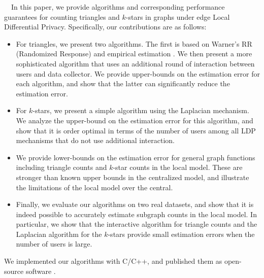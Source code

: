 \smallskip
{}~~In this paper, we provide 
algorithms and corresponding performance guarantees for counting triangles and $k$-stars in graphs under edge Local Differential Privacy. Specifically, our contributions are as follows:
\begin{itemize}
    \item For triangles, we present two algorithms. The first is based on 
    Warner's RR (Randomized Response) \cite{Warner_JASA65} 
    and empirical estimation \cite{Kairouz_ICML16,Murakami_USENIX19,Wang_USENIX17}. 
    We then present a more sophisticated algorithm that uses an additional round of interaction between users and data collector. We provide upper-bounds on the estimation error for each algorithm, and show that the latter can  significantly reduce the estimation error. 
    
    \item For $k$-stars, we present a simple algorithm using the Laplacian mechanism. We analyze the upper-bound on the estimation error for this algorithm, and 
    show that it is order optimal in terms of the number of users among all LDP mechanisms that do not use additional interaction.
    
    \item We provide lower-bounds on the estimation error for 
    general graph functions including triangle counts and $k$-star counts in the local model. These are stronger than known upper bounds in the centralized model, and illustrate the limitations of the local model over the central.
    
    \item Finally, we evaluate our algorithms on two real datasets, and show that 
    it is indeed possible to accurately estimate 
    subgraph counts in the local model. 
    In particular, we show that 
    the interactive algorithm for triangle counts and the Laplacian algorithm for the $k$-stars provide small estimation errors when the number of users is large.
\end{itemize}

We implemented our algorithms with C/C++, and published them as open-source software \cite{LDPGraphStatistics}.


